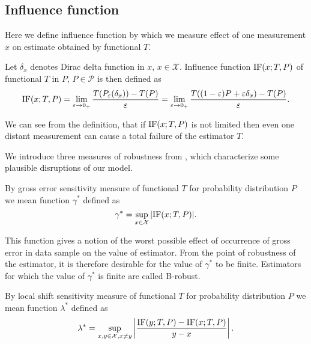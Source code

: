 \subsection{Influence  function}

Here we define influence function by which we measure effect of one measurement $x$ on estimate obtained by functional $T$.

\begin{definition}
	Let $\delta_x$ denotes Dirac delta function in $x,\, x \in \mathcal{X}$. Influence function $\mathrm{IF}({x};T,P)$ of functional $T$ in $P,\, P \in \mathcal{P}$ is then defined as
	\begin{equation}
		\mathrm{IF}({x};T,P) = \lim_{\varepsilon \rightarrow 0_+} \frac{T(P_\varepsilon(\delta_x)) - T(P)}{\varepsilon} = \lim_{\varepsilon \rightarrow 0_+} \frac{T((1-\varepsilon)P + \varepsilon\delta_x) - T(P)}{\varepsilon}.
	\end{equation} 
\end{definition}

We can see from the definition, that if $\mathrm{IF}({x};T,P)$ is not limited then even one distant measurement can cause a total failure of the estimator $T$.

We introduce three measures of robustness from \cite{Antoch92}, which characterize some plausible disruptions of our model. 

\begin{definition}
	By gross error sensitivity measure of functional $T$ for probability distribution $P$ we mean function  $\gamma^*$ defined as 
	\begin{equation}
		\gamma^* = \sup_{x \in \mathcal{X}} |\mathrm{IF}({x};T,P)|.
	\end{equation}
\end{definition}
This function gives a notion of the worst possible effect of occurrence of gross error in data sample on the value of estimator.  From the point of robustness of the estimator, it is therefore desirable for the value of $\gamma^*$ to be finite. Estimators for which the value of $\gamma^*$ is finite are called B-robust.

\begin{definition}
	By local shift sensitivity measure of functional $T$ for probability distribution $P$ we mean function  $\lambda^*$ defined as 
	\begin{equation}
			\lambda^* = \sup_{x,y \in \mathcal{X},x \neq y}  \left| \frac{\mathrm{IF}({y};T,P) - \mathrm{IF}({x};T,P)}{y-x} \right|.
	\end{equation}
\end{definition}

